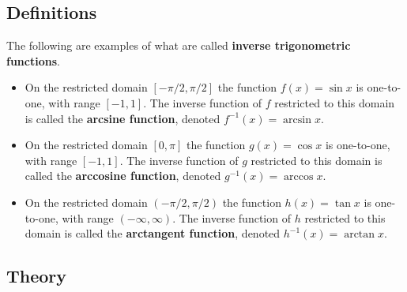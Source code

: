 \thispagestyle{fancy}
\subsection*{Definitions}
\begin{namedtheorem} The following are examples of what are called {\bf inverse trigonometric functions}.
  \begin{itemize}
    \item On the restricted domain $[-\pi/2, \pi/2]$ the function $f(x)=\sin x$ is one-to-one, with range $[-1,1]$. The inverse function of $f$ restricted to this domain is called the {\bf arcsine function}, denoted $f^{-1}(x)=\arcsin x$.
    \item On the restricted domain $[0, \pi]$ the function $g(x)=\cos x$ is one-to-one, with range $[-1,1]$. The inverse function of $g$ restricted to this domain is called the {\bf arccosine function}, denoted $g^{-1}(x)=\arccos x$.
    \item On the restricted domain $(-\pi/2, \pi/2)$ the function $h(x)=\tan x$ is one-to-one, with range $(-\infty, \infty)$. The inverse function of $h$ restricted to this domain is called the {\bf arctangent function}, denoted $h^{-1}(x)=\arctan x$.
  \end{itemize}

\end{namedtheorem}
\begin{comment}
Occasionally an alternative notation is used to denote inverse trig functions: namely,
\begin{align*}
  \arcsin x&=\sin^{-1} x & \arccos x&=\cos^{-1} x & \arctan x&=\tan^{-1} x.
\end{align*}
We will avoid this alternative notation as it misleadingly suggests these inverse trigonometric functions are {\em reciprocals} of the corresponding trigonometric functions. They are not!
\end{comment}

 \subsection*{Theory}

